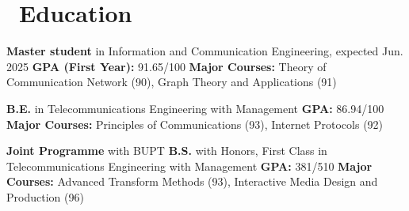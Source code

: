 \documentclass{resume}
\begin{document}



\section{\faGraduationCap\ Education}
\textbf{Master student} in Information and Communication Engineering, expected Jun. 2025 \newline
\textbf{GPA (First Year):} 91.65/100 \newline
\textbf{Major Courses:} Theory of Communication Network (90), Graph Theory and Applications (91)

\textbf{B.E.} in Telecommunications Engineering with Management \newline
\textbf{GPA:} 86.94/100 \newline
\textbf{Major Courses:} Principles of Communications (93), Internet Protocols (92)

\textbf{Joint Programme} with BUPT \newline
\textbf{B.S.} with Honors, First Class in Telecommunications Engineering with Management \newline
\textbf{GPA:} 381/510 \newline
\textbf{Major Courses:} Advanced Transform Methods (93), Interactive Media Design and Production (96)
\end{document}
